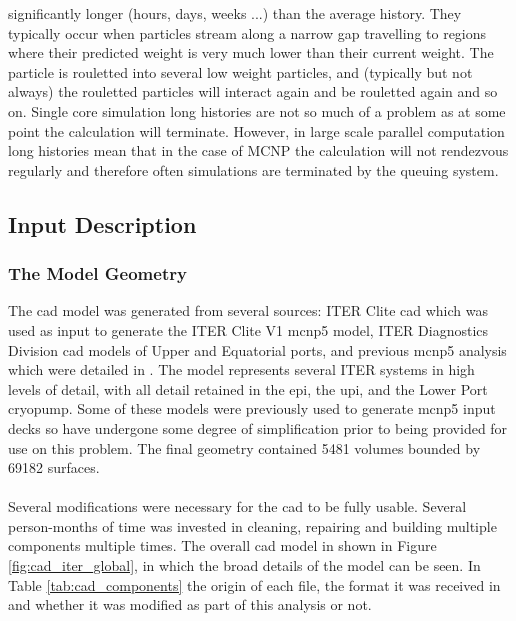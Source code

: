 \documentclass[12pt]{article}
\begin{document}
significantly longer (hours, days, weeks ...) than the average history. They 
typically occur when particles stream along a narrow gap travelling to regions
where their predicted weight is very much lower than their current weight. The 
particle is rouletted into several low weight particles, and (typically but not
always) the rouletted particles will interact again and be rouletted again and 
so on. Single core  simulation long histories are not so much of a problem as 
at some point the calculation will terminate. However, in large scale parallel 
computation long histories mean that in the case of MCNP the calculation will
not rendezvous regularly and therefore often simulations are terminated by the 
queuing system. 


\subsection{Input Description}
\subsubsection{The Model Geometry}
The \gls{cad} model was generated from several sources: ITER Clite \gls{cad}
which was used as input to generate the ITER Clite V1 \gls{mcnp5} model, ITER
Diagnostics Division \gls{cad} models of Upper and Equatorial ports, and
previous \gls{mcnp5} analysis which were detailed in \cite{cad_origination}. The
model represents several ITER systems in high levels of detail, with all detail
retained in the \gls{epi}, the  \gls{upi}, and the Lower Port cryopump. Some of
these models were previously used to generate \gls{mcnp5} input decks so have
undergone some degree of simplification prior to being provided for use on this 
problem.  The final geometry contained 5481 volumes bounded by 69182 surfaces.
\\
\\
Several modifications were necessary for the \gls{cad} to be fully usable. Several
person-months of time was invested in cleaning, repairing and building multiple
components multiple times. The overall \gls{cad} model in shown in Figure 
\ref{fig:cad_iter_global}, in which the broad details of the model can be seen. In
Table \ref{tab:cad_components} the origin of each file, the format it was received
in and whether it was modified as part of this analysis or not.
\end{document}
